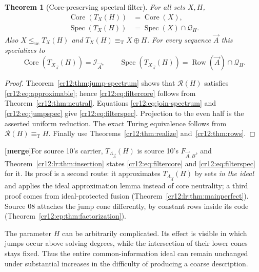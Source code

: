 \documentclass[11pt,letterpaper]{article}
\theoremstyle{plain}
\newtheorem{theorem}{Theorem}[section]
\theoremstyle{definition}
\theoremstyle{remark}
\numberwithin{equation}{section}
\newcommand{\eqT}{\equiv_{\mathrm T}}
\newcommand{\leuc}{\leq_{\mathrm{uc}}}
\newcommand{\Core}{\operatorname{Core}}
\newcommand{\Spec}{\operatorname{Spec}}
\newcommand{\Row}{\operatorname{Row}}
\newcommand{\Rcode}{\mathcal R}
\newcommand{\I}{\mathcal I}
\newcommand{\mergenote}[1]{\par\smallskip\noindent
 {\small\textsf{\textbf{[merge]}}\enspace #1}\par\smallskip}
\newcommand{\Lam}{\Lambda_{\vec A}}      %
\begin{document}
\begin{theorem}[Core-preserving spectral filter]\label{cr12:thm:filter}
For all sets $X,H$,
\begin{align}
 \Core(T_X(H))&=\Core(X),\label{cr12:eq:filtercore}\\
 \Spec(T_X(H))&=\Spec(X)\cap\mathcal Q_H.\label{cr12:eq:filterspec}
\end{align}
Also $X\leuc T_X(H)$ and $T_X(H)\eqT X\oplus H$.
For every sequence $\vec A$ this specializes to
\begin{equation}\label{cr12:eq:combined}
 \Core(T_{X_{\vec A}}(H))=\I_{\vec A},\qquad
 \Spec(T_{X_{\vec A}}(H))=\Row(\vec A)\cap\mathcal Q_H.
\end{equation}
\end{theorem}
\begin{proof}
Theorem~\ref{cr12:thm:jump-spectrum} shows that $\Rcode(H)$ satisfies
\eqref{cr12:eq:approximable}; hence \eqref{cr12:eq:filtercore} follows from
Theorem~\ref{cr12:thm:neutral}. Equations \eqref{cr12:eq:join-spectrum} and
\eqref{cr12:eq:jumpspec} give \eqref{cr12:eq:filterspec}. Projection to the even half
is the asserted uniform reduction. The exact Turing equivalence follows from
$\Rcode(H)\eqT H$. Finally use Theorems~\ref{cr12:thm:realize} and~\ref{cr12:thm:rows}.
\end{proof}
\mergenote{For source 10's carrier, $T_{\Lam}(H)$ is source 10's $F_{\vec A,B}$, and
Theorem~\ref{cr12:lr:thm:insertion} states \eqref{cr12:eq:filtercore} and
\eqref{cr12:eq:filterspec} for it. Its proof is a second route: it approximates
$T_{\Lam}(H)$ by sets \emph{in the ideal} and applies the ideal approximation lemma
instead of core neutrality; a third proof comes from ideal-protected fusion
(Theorem~\ref{cr12:lr:thm:mainperfect}). Source 08 attaches the jump cone
differently, by constant rows inside its code
(Theorem~\ref{cr12:ep:thm:factorization}).}

The parameter $H$ can be arbitrarily complicated. Its effect is visible in
which jumps occur above solving degrees, while the intersection of their lower
cones stays fixed. Thus the entire common-information ideal can remain
unchanged under substantial increases in the difficulty of producing a coarse
description.
\end{document}
